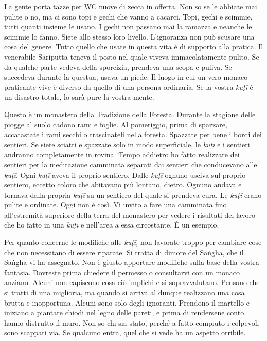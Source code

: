 La gente porta tazze per WC nuove di zecca in offerta. Non so se le
abbiate mai pulite o no, ma ci sono topi e gechi che vanno a cacarci.
Topi, gechi e scimmie, tutti quanti insieme le usano. I gechi non
passano mai la ramazza e neanche le scimmie lo fanno. Siete allo stesso
loro livello. L'ignoranza non può scusare una cosa del genere. Tutto
quello che usate in questa vita è di supporto alla pratica. Il
venerabile Sāriputta teneva il posto nel quale viveva immacolatamente
pulito. Se da qualche parte vedeva della sporcizia, prendeva una scopa e
puliva. Se succedeva durante la questua, usava un piede. Il luogo in cui
un vero monaco praticante vive è diverso da quello di una persona
ordinaria. Se la vostra \emph{kuṭī} è un disastro totale, lo sarà pure
la vostra mente.

Questo è un monastero della Tradizione della Foresta. Durante la
stagione delle piogge al suolo cadono rami e foglie. Al pomeriggio,
prima di spazzare, accatastate i rami secchi o trascinateli nella
foresta. Spazzate per bene i bordi dei sentieri. Se siete sciatti e
spazzate solo in modo superficiale, le \emph{kuṭī} e i sentieri andranno
completamente in rovina. Tempo addietro ho fatto realizzare dei sentieri
per la meditazione camminata separati dai sentieri che conducevano alle
\emph{kuṭī}. Ogni \emph{kuṭī} aveva il proprio sentiero. Dalle
\emph{kuṭī} ognuno usciva sul proprio sentiero, eccetto coloro che
abitavano più lontano, dietro. Ognuno andava e tornava dalla propria
\emph{kuṭī} su un sentiero del quale si prendeva cura. Le \emph{kuṭī}
erano pulite e ordinate. Oggi non è così. Vi invito a fare una camminata
fino all'estremità superiore della terra del monastero per vedere i
risultati del lavoro che ho fatto in una \emph{kuṭī} e nell'area a essa
circostante. È un esempio.

Per quanto concerne le modifiche alle \emph{kuṭī,} non lavorate troppo
per cambiare cose che non necessitano di essere riparate. Si tratta di
dimore del Saṅgha, che il Saṅgha vi ha assegnato. Non è giusto apportare
modifiche sulla base della vostra fantasia. Dovreste prima chiedere il
permesso o consultarvi con un monaco anziano. Alcuni non capiscono cosa
ciò implichi e si sopravvalutano. Pensano che si tratti di una
miglioria, ma quando si arriva al dunque realizzano una cosa brutta e
inopportuna. Alcuni sono solo degli ignoranti. Prendono il martello e
iniziano a piantare chiodi nel legno delle pareti, e prima di rendersene
conto hanno distrutto il muro. Non so chi sia stato, perché a fatto
compiuto i colpevoli sono scappati via. Se qualcuno entra, quel che si
vede ha un aspetto orribile.

